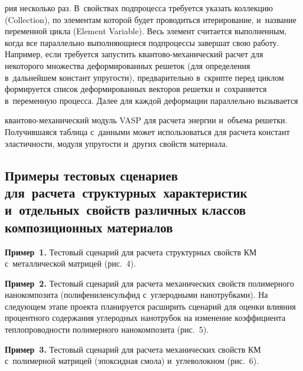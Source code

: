 \begin{multicols}{2}
\begin{description}
\noindent
рия несколько раз. В~свойствах подпроцесса требуется указать коллекцию 
(Collection), по элементам которой будет проводиться ите\-ри\-ро\-ва\-ние, и~название 
переменной цикла (Element Variable). Весь элемент считается выполненным, когда 
все параллельно выполняющиеся подпроцессы завершат свою работу. Например, 
если требуется запустить кван\-то\-во-ме\-ха\-ни\-че\-ский расчет для некоторого 
множества деформированных решеток (для определения в~дальнейшем констант 
упру\-гости), предварительно в~скрип\-те перед цик\-лом формируется список 
деформированных векторов решетки и~сохраняется в~переменную процесса. 
Далее для каж\-дой деформации параллельно вызывается\linebreak\vspace*{-12pt}

\pagebreak

\noindent  
кван\-то\-во-ме\-ха\-ни\-че\-ский модуль VASP для расчета энергии и~объема 
решетки. Получившаяся таб\-ли\-ца с~данными может использоваться для расчета 
констант элас\-тич\-ности, модуля упру\-гости и~других свойств материала.
\end{description}

\vspace*{-9pt}
  
  \subsection*{Примеры тестовых сценариев для~расчета~структурных~характеристик 
  и~отдельных~свойств различных классов 
композиционных материалов}


     
     \textbf{Пример~1.} Тестовый сценарий для расчета структурных свойств 
КМ с~металлической мат\-ри\-цей (рис.~4).

\smallskip

     
     \textbf{Пример~2.} Тестовый сценарий для расчета механических свойств 
полимерного нанокомпозита (полифениленсульфид с~углеродными нанотрубками). 
На сле\-ду\-ющем этапе проекта планируется расширить сценарий для 
оценки влияния процентного содержания углеродных нанотрубок на изменение 
коэффициента теп\-ло\-про\-вод\-ности полимерного нанокомпозита (рис.~5).
  
 
     
     \textbf{Пример~3.} Тестовый сценарий для расчета механических свойств 
КМ с~полимерной мат\-ри\-цей (эпоксидная смола) и~углеволокном
(рис.~6).

\vspace*{-6pt}


\end{multicols}
